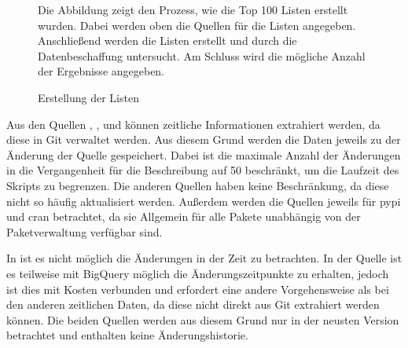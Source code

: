 \begin{figure}
    \centering
    
    \caption{Erstellung der Listen}
    \label{fig:erstellung_listen}
    \small
    Die Abbildung zeigt den Prozess, wie die Top 100 Listen erstellt wurden. Dabei werden oben die Quellen für die Listen angegeben. Anschließend werden die Listen erstellt und durch die Datenbeschaffung untersucht. Am Schluss wird die mögliche Anzahl der Ergebnisse angegeben.
\end{figure}

Aus den Quellen , ,  und  können zeitliche Informationen extrahiert werden, da diese in Git verwaltet werden.
Aus diesem Grund werden die Daten jeweils zu der Änderung der Quelle gespeichert.
Dabei ist die maximale Anzahl der Änderungen in die Vergangenheit für die Beschreibung auf 50 beschränkt, um die Laufzeit des Skripts zu begrenzen.
Die anderen Quellen haben keine Beschränkung, da diese nicht so häufig aktualisiert werden.
Außerdem werden die Quellen jeweils für \gls{pypi} und \gls{cran} betrachtet, da sie Allgemein für alle Pakete unabhängig von der Paketverwaltung verfügbar sind.

In  ist es nicht möglich die Änderungen in der Zeit zu betrachten.
In der  Quelle ist es teilweise mit BigQuery möglich die Änderungszeitpunkte zu erhalten, jedoch ist dies mit Kosten verbunden und erfordert eine andere Vorgehensweise als bei den anderen zeitlichen Daten, da diese nicht direkt aus Git extrahiert werden können.
Die beiden Quellen werden aus diesem Grund nur in der neusten Version betrachtet und enthalten keine Änderungshistorie.







